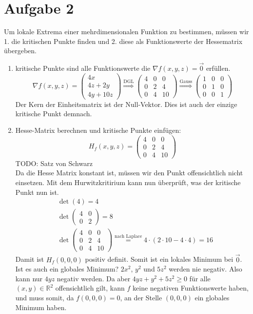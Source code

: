\documentclass[10pt,a4paper,parskip=half]{scrartcl}
\begin{document}
\section*{Aufgabe 2}
Um lokale Extrema einer mehrdimensionalen Funktion zu bestimmen, müssen wir 1. die kritischen Punkte finden und 2. diese als Funktionswerte der Hessematrix übergeben.
\begin{enumerate}
	\item kritische Punkte sind alle Funktionswerte die $\nabla f(x,y,z) = \vec0$ erfüllen.
	\[\nabla f(x,y,z) = 
	\begin{pmatrix}
		4x \\ 
		4z + 2y \\
		4y + 10z	
	\end{pmatrix} \overset{\text{DGL}}{\Rightarrow}
	\begin{pmatrix}
		4 & 0 & 0 \\
		0 & 2 & 4 \\
		0 & 4 & 10 
	\end{pmatrix} \overset{\text{Gauss}}{\Rightarrow}
	\begin{pmatrix}
		1 & 0 & 0 \\
		0 & 1 & 0 \\
		0 & 0 & 1
	\end{pmatrix}\]
	Der Kern der Einheitsmatrix ist der Null-Vektor. Dies ist auch der einzige kritische Punkt demnach.
	\item Hesse-Matrix berechnen und kritische Punkte einfügen:
	\[H_f(x,y,z) =
	\begin{pmatrix}
		4 & 0 & 0 \\
		0 & 2 & 4 \\
		0 & 4 & 10
	\end{pmatrix}
	\] 
	TODO: Satz von Schwarz\\
	Da die Hesse Matrix konstant ist, müssen wir den Punkt offensichtlich nicht einsetzen. Mit dem Hurwitzkritirium kann nun überprüft, was der kritische Punkt nun ist. 
	\begin{align*}
	 	&\det(4) = 4 \\
	 	&\det \begin{pmatrix}
	 		4 & 0 \\
	 		0 & 2	
	 	\end{pmatrix} = 8 \\
	 	&\det \begin{pmatrix}
	 		4 & 0 & 0 \\
			0 & 2 & 4 \\
			0 & 4 & 10
	 	\end{pmatrix} \overset{\text{nach Laplace}}{=} 4\cdot (2\cdot10 - 4\cdot4) = 16
	 \end{align*} Damit ist $H_f(0,0,0)$ positiv definit. Somit ist ein lokales Minimum bei $\vec 0$. Ist es auch ein globales Minimum? 
	$2x^2$, $y^2$ und $5z^2$ werden nie negativ. Also kann nur $4yz$ negativ werden. Da aber $4yz  + y^2 + 5z^2 \ge 0$ für alle $(x,y) \in \mathbb{R}^2$ offensichtlich gilt, kann $f$ keine negativen Funktionswerte haben,  und muss somit, da $f(0,0,0) = 0$, an der Stelle $(0,0,0)$ ein globales Minimum haben.
\end{enumerate}
\end{document}
